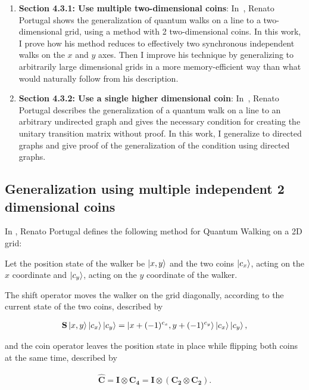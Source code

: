 \begin{enumerate}
    \item \textbf{Section 4.3.1: Use multiple two-dimensional coins}: In~\cite{Portugal}, Renato Portugal shows the generalization of quantum walks on a line to a two-dimensional grid, using a method with 2 two-dimensional coins. In this work, I prove how his method reduces to effectively two synchronous independent walks on the $x$ and $y$ axes. Then I improve his technique by generalizing to arbitrarily large dimensional grids in a more memory-efficient way than what would naturally follow from his description.
    \item \textbf{Section 4.3.2: Use a single higher dimensional coin}: In~\cite{Portugal}, Renato Portugal describes the generalization of a quantum walk on a line to an arbitrary undirected graph and gives the necessary condition for creating the unitary transition matrix without proof. In this work, I generalize to directed graphs and give proof of the generalization of the condition using directed graphs.
\end{enumerate}

\subsection{Generalization using multiple independent 2 dimensional coins}

In \cite{Portugal}, Renato Portugal defines the following method for Quantum Walking on a 2D grid:

Let the position state of the walker be $\ket{x,y}$ and the two coins $\ket{c_x}$, acting on the $x$ coordinate and $\ket{c_y}$, acting on the $y$ coordinate of the walker.

The shift operator moves the walker on the grid diagonally, according to the current state of the two coins, described by

\begin{align}
\label{Portugal2DShift}
    \mathbf{S}\ket{x,y}\ket{c_x}\ket{c_y} = \ket{x + (-1)^{c_x}, y + (-1)^{c_y}}\ket{c_x}\ket{c_y},
\end{align}

and the coin operator leaves the position state in place while flipping both coins at the same time, described by

\begin{align}
\mathbf{\hat{C}} = \mathbf{I} \otimes \mathbf{C_4} = \mathbf{I} \otimes (\mathbf{C_2} \otimes \mathbf{C_2}).
\end{align}

